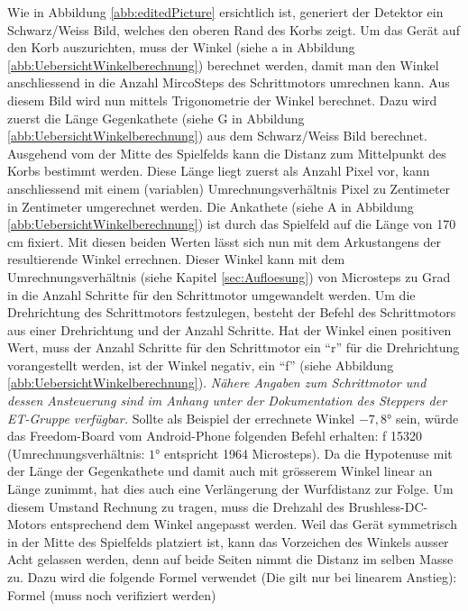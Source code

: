 Wie in Abbildung \ref{abb:editedPicture} ersichtlich ist, generiert der Detektor ein Schwarz/Weiss Bild, welches den oberen Rand des Korbs zeigt. 
Um das Gerät auf den Korb auszurichten, muss der Winkel (siehe a in Abbildung \ref{abb:UebersichtWinkelberechnung}) berechnet werden, 
damit man den Winkel anschliessend in die Anzahl MircoSteps des Schrittmotors umrechnen kann.
\newline
\newline
Aus diesem Bild wird nun mittels Trigonometrie der Winkel berechnet. 
Dazu wird zuerst die Länge Gegenkathete (siehe G in Abbildung \ref{abb:UebersichtWinkelberechnung}) 
aus dem Schwarz/Weiss Bild berechnet. Ausgehend vom der Mitte des Spielfelds kann die Distanz zum Mittelpunkt des 
Korbs bestimmt werden. Diese Länge liegt zuerst als Anzahl Pixel vor, 
kann anschliessend mit einem (variablen) Umrechnungsverhältnis Pixel zu Zentimeter in Zentimeter umgerechnet werden.
Die Ankathete (siehe A in Abbildung \ref{abb:UebersichtWinkelberechnung}) ist durch das Spielfeld auf die Länge von 170 cm fixiert.
Mit diesen beiden Werten lässt sich nun mit dem Arkustangens der resultierende Winkel errechnen.
Dieser Winkel kann mit dem Umrechnungsverhältnis (siehe Kapitel \ref{sec:Aufloesung}) von Microsteps zu Grad 
in die Anzahl Schritte für den Schrittmotor umgewandelt werden. Um die Drehrichtung des Schrittmotors festzulegen, besteht der 
Befehl des Schrittmotors aus einer Drehrichtung und der Anzahl Schritte. Hat der Winkel einen positiven Wert, muss der Anzahl 
Schritte für den Schrittmotor ein  \enquote{r} für die Drehrichtung vorangestellt werden, ist der Winkel negativ, ein  \enquote{f} 
(siehe Abbildung \ref{abb:UebersichtWinkelberechnung}).  
\newline
\newline
\textit{Nähere Angaben zum Schrittmotor und dessen Ansteuerung sind im Anhang unter der Dokumentation des Steppers der ET-Gruppe verfügbar.}
\newline
\newline
Sollte als Beispiel der errechnete Winkel $-7,8\si{\degree}$ sein, würde das Freedom-Board vom Android-Phone folgenden 
Befehl erhalten: f 15320 (Umrechnungsverhältnis: $1\si{\degree}$ entspricht 1964 Microsteps).
Da die Hypotenuse mit der Länge der Gegenkathete und damit auch mit grösserem Winkel linear an Länge zunimmt, 
hat dies auch eine Verlängerung der Wurfdistanz zur Folge. Um diesem Umstand Rechnung zu tragen, muss die Drehzahl des 
Brushless-DC-Motors entsprechend dem Winkel angepasst werden. Weil das Gerät symmetrisch in der Mitte des Spielfelds platziert ist, 
kann das Vorzeichen des Winkels ausser Acht gelassen werden, denn auf beide Seiten nimmt die Distanz im selben Masse zu.
Dazu wird die folgende Formel verwendet (Die gilt nur bei linearem Anstieg):
\newline
\newline
Formel (muss noch verifiziert werden)
 
